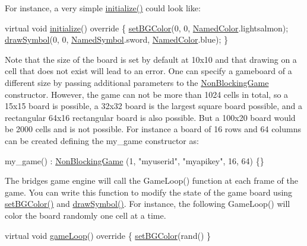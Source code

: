 For instance, a very simple \hyperlink{classbridges_1_1game_1_1_game_base_a9b6eb6fa7fceaac09d204b549164037f}{initialize()} could look like\+: 
\begin{DoxyCode}
\textcolor{keyword}{virtual} \textcolor{keywordtype}{void} \hyperlink{classbridges_1_1game_1_1_game_base_a9b6eb6fa7fceaac09d204b549164037f}{initialize}()\textcolor{keyword}{ override }\{
  \hyperlink{classbridges_1_1game_1_1_game_base_ab667bbca1c81e5fb3aa8d81d70fe8cd2}{setBGColor}(0, 0, \hyperlink{namespacebridges_1_1game_afaa832a4322b25b6a4ebfba832f10f26}{NamedColor}.lightsalmon);
  \hyperlink{classbridges_1_1game_1_1_game_base_a415fa8f70bef364dfa966f2a86048901}{drawSymbol}(0, 0, \hyperlink{namespacebridges_1_1game_ab9a19c7ab6e2ebac2f95180e21733487}{NamedSymbol}.sword, \hyperlink{namespacebridges_1_1game_afaa832a4322b25b6a4ebfba832f10f26}{NamedColor}.blue);
\}
\end{DoxyCode}


Note that the size of the board is set by default at 10x10 and that drawing on a cell that does not exist will lead to an error. One can specify a gameboard of a different size by passing additional parameters to the \hyperlink{classbridges_1_1game_1_1_non_blocking_game}{Non\+Blocking\+Game} constructor. However, the game can not be more than 1024 cells in total, so a 15x15 board is possible, a 32x32 board is the largest square board possible, and a rectangular 64x16 rectangular board is also possible. But a 100x20 board would be 2000 cells and is not possible. For instance a board of 16 rows and 64 columns can be created defining the my\+\_\+game constructor as\+:


\begin{DoxyCode}
my\_game() : \hyperlink{classbridges_1_1game_1_1_non_blocking_game_a3226aa7e7ff129e916f4bd5aabcb2e72}{NonBlockingGame} (1, \textcolor{stringliteral}{"myuserid"},  \textcolor{stringliteral}{"myapikey"}, 16, 64) \{\}
\end{DoxyCode}


The bridges game engine will call the Game\+Loop() function at each frame of the game. You can write this function to modify the state of the game board using \hyperlink{classbridges_1_1game_1_1_game_base_ab667bbca1c81e5fb3aa8d81d70fe8cd2}{set\+B\+G\+Color()} and \hyperlink{classbridges_1_1game_1_1_game_base_a415fa8f70bef364dfa966f2a86048901}{draw\+Symbol()}. For instance, the following Game\+Loop() will color the board randomly one cell at a time.


\begin{DoxyCode}
\textcolor{keyword}{virtual} \textcolor{keywordtype}{void} \hyperlink{classbridges_1_1game_1_1_game_base_a16fb787bc65be1a582cddcfba3a0c5bb}{gameLoop}()\textcolor{keyword}{ override }\{
  \hyperlink{classbridges_1_1game_1_1_game_base_ab667bbca1c81e5fb3aa8d81d70fe8cd2}{setBGColor}(rand()%
\}
\end{DoxyCode}


